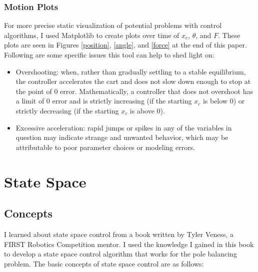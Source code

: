 \documentclass[11pt]{article}
\begin{document}
\subsubsection{Motion Plots}

For more precise static visualization of potential problems with control algorithms, I used Matplotlib \cite{matplotlib} to create plots over time of $x _c$, $\theta$, and $F$. These plots are seen in Figures \ref{position}, \ref{angle}, and \ref{force} at the end of this paper. Following are some specific issues this tool can help to shed light on:

\begin{itemize}
    \item Overshooting: when, rather than gradually settling to a stable equilibrium, the controller accelerates the cart and does not slow down enough to stop at the point of 0 error. Mathematically, a controller that does not overshoot has a limit of 0 error and is strictly increasing (if the starting $x _c$ is below 0) or strictly decreasing (if the starting $x _c$ is above 0).
    \item Excessive acceleration: rapid jumps or spikes in any of the variables in question may indicate strange and unwanted behavior, which may be attributable to poor parameter choices or modeling errors.
\end{itemize}

\section{State Space}

\subsection{Concepts}

I learned about state space control from a book \cite{veness} written by Tyler Veness, a FIRST Robotics Competition mentor. I used the knowledge I gained in this book to develop a state space control algorithm that works for the pole balancing problem. The basic concepts of state space control are as follows:
\end{document}
